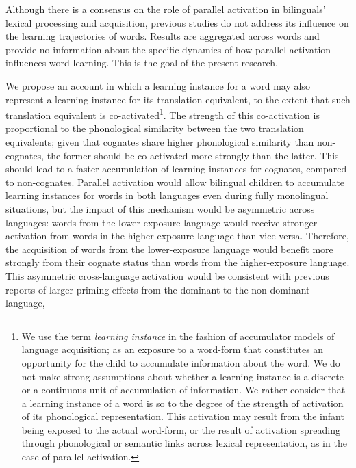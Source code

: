 \documentclass[
]{article}
\begin{document}
Although there is a consensus on the role of parallel activation in
bilinguals' lexical processing and acquisition, previous studies do not
address its influence on the learning trajectories of words. Results are
aggregated across words and provide no information about the specific
dynamics of how parallel activation influences word learning. This is
the goal of the present research.

We propose an account in which a learning instance for a word may also
represent a learning instance for its translation equivalent, to the
extent that such translation equivalent is co-activated\footnote{We use
  the term \emph{learning instance} in the fashion of accumulator models
  of language acquisition; as an exposure to a word-form that
  constitutes an opportunity for the child to accumulate information
  about the word. We do not make strong assumptions about whether a
  learning instance is a discrete or a continuous unit of accumulation
  of information. We rather consider that a learning instance of a word
  is so to the degree of the strength of activation of its phonological
  representation. This activation may result from the infant being
  exposed to the actual word-form, or the result of activation spreading
  through phonological or semantic links across lexical representation,
  as in the case of parallel activation.}. The strength of this
co-activation is proportional to the phonological similarity between the
two translation equivalents; given that cognates share higher
phonological similarity than non-cognates, the former should be
co-activated more strongly than the latter. This should lead to a faster
accumulation of learning instances for cognates, compared to
non-cognates. Parallel activation would allow bilingual children to
accumulate learning instances for words in both languages even during
fully monolingual situations, but the impact of this mechanism would be
asymmetric across languages: words from the lower-exposure language
would receive stronger activation from words in the higher-exposure
language than vice versa. Therefore, the acquisition of words from the
lower-exposure language would benefit more strongly from their cognate
status than words from the higher-exposure language. This asymmetric
cross-language activation would be consistent with previous reports of
larger priming effects from the dominant to the non-dominant language,
\end{document}
